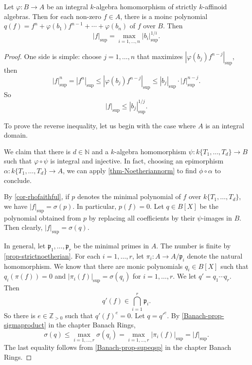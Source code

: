 \begin{proposition}\label{prop-integralstrictafffsup}
    Let $\varphi:B\rightarrow A$ be an integral $k$-algebra homomorphism of strictly $k$-affinoid algebras. Then for each non-zero $f\in A$, there is a moinc polynomial $q(f)=f^n+\varphi(b_1)f^{n-1}+\cdots+\varphi(b_n)$ of $f$ over $B$. Then 
    \[
        |f|_{\sup}=\max_{i=1,\ldots,n}|b_i|_{\sup}^{1/i}.  
    \]
\end{proposition}
\begin{proof}
    One side is simple: choose $j=1,\ldots,n$ that maximizes $|\varphi(b_j)f^{n-j}|_{\sup}$, then
    \[
        |f|_{\sup}^n=|f^n|_{\sup}\leq  |\varphi(b_j)f^{n-j}|_{\sup}\leq |b_j|_{\sup}\cdot |f|_{\sup}^{n-j}.
    \]
    So
    \[
        |f|_{\sup}\leq |b_j|_{\sup}^{1/j}.  
    \]

    To prove the reverse inequality, let us begin with the case where $A$ is an integral domain. 
    
    We claim that there is $d\in \mathbb{N}$ and a $k$-algebra homomorphism $\psi:k\{T_1,\ldots,T_d\}\rightarrow B$ such that $\varphi\circ \psi$ is integral and injective.  In fact, choosing an epimorphism $\alpha:k\{T_1,\ldots,T_d\}\rightarrow A$, we can apply \cref{thm-Noetheriannorm} to find $\phi\circ \alpha$ to conclude.

    By \cref{cor-rhofaithful}, if $p$ denotes the minimal polynomial of $f$ over $k\{T_1,\ldots,T_d\}$, we have $|f|_{\sup}=\sigma(p)$. In particular, $p(f)=0$. Let $q\in B[X]$ be the polynomial obtained from $p$ by replacing all coefficients by their $\psi$-images in $B$. Then clearly, $|f|_{\sup}=\sigma(q)$.

    In general, let $\mathfrak{p}_1,\ldots,\mathfrak{p}_r$ be the minimal primes in $A$. The number is finite by \cref{prop-strictnoetherian}. For each $i=1,\ldots,r$, let $\pi_i:A\rightarrow A/\mathfrak{p}_i$ denote the natural homomorphism. We know that there are monic polynomials $q_i\in B[X]$ such that $q_i(\pi(f))=0$ and $|\pi_i(f)|_{\sup}=\sigma(q_i)$ for $i=1,\ldots,r$. We let $q'=q_1\cdots q_r$. Then 
    \[
        q'(f)\in \bigcap_{i=1}^r\mathfrak{p}_i.
    \]
    So there is $e\in \mathbb{Z}_{>0}$ such that $q'(f)^e=0$. Let $q=q'^e$. By \cref{Banach-prop-sigmaproduct} in the chapter Banach Rings,
    \[
        \sigma(q)\leq  \max_{i=1,\ldots,r}\sigma(q_i) =\max_{i=1,\ldots,r} |\pi_i(f)|_{\sup}=|f|_{\sup}.
    \]
    The last equality follows from \cref{Banach-prop-supeqsp} in the chapter Banach Rings.
\end{proof}


